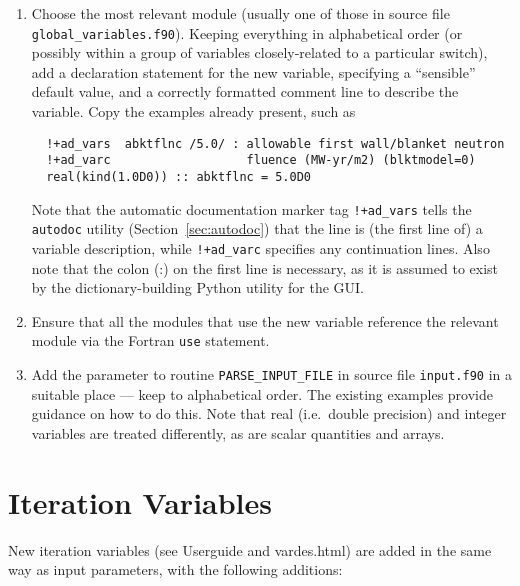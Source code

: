 \documentclass[11pt,a4paper]{report}
\begin{document}
\begin{enumerate}

\item Choose the most relevant module (usually one of those in source file
  \texttt{global\_variables.f90}). Keeping everything in alphabetical order
  (or possibly within a group of variables closely-related to a particular
  switch), add a declaration statement for the new variable, specifying a
  ``sensible'' default value, and a correctly formatted comment line to
  describe the variable. Copy the examples already present, such as
\begin{verbatim}
  !+ad_vars  abktflnc /5.0/ : allowable first wall/blanket neutron
  !+ad_varc                   fluence (MW-yr/m2) (blktmodel=0)
  real(kind(1.0D0)) :: abktflnc = 5.0D0
\end{verbatim}
  Note that the automatic documentation marker tag \verb.!+ad_vars. tells the
  \texttt{autodoc} utility (Section~\ref{sec:autodoc}) that the line is (the
  first line of) a variable description, while \verb.!+ad_varc. specifies any
  continuation lines. Also note that the colon (:) on the first line is
  necessary, as it is assumed to exist by the dictionary-building Python
  utility for the GUI\@.


\item Ensure that all the modules that use the new variable reference the
  relevant module via the Fortran \texttt{use} statement.

\item Add the parameter to routine \texttt{PARSE\_INPUT\_FILE} in source file
  \texttt{input.f90} in a suitable place --- keep to alphabetical order. The
  existing examples provide guidance on how to do this. Note that real (i.e.\
  double precision) and integer variables are treated differently, as are
  scalar quantities and arrays.


\end{enumerate}

\section{Iteration Variables}

New iteration variables (see Userguide and vardes.html) are added in the
same way as input parameters, with the following additions:
\end{document}
